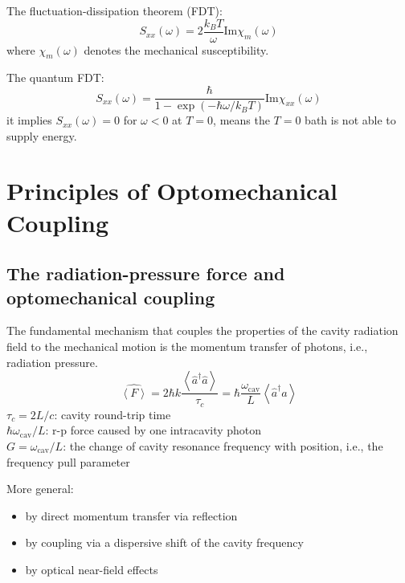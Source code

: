 \documentclass[8pt,a4paper,twocolumn]{article} %
\numberwithin{equation}{section} %
\begin{document}
				The fluctuation-dissipation theorem (FDT):
				\begin{equation}
					S_{xx}(\omega)=2 \frac{k_B T}{\omega} \text{Im} \chi_m (\omega)
				\end{equation}
				where $\chi_m (\omega)$ denotes the mechanical susceptibility.

				The quantum FDT:
				\begin{equation}
					S_{xx}(\omega)= \frac{\hbar}{1-\exp (-\hbar \omega/k_B T) } \text{Im} \chi_{xx} (\omega)
				\end{equation}
				it implies $S_{xx}(\omega)=0 $ for $ \omega<0 $ at $T=0 $, means the $ T=0 $ bath is not able to supply energy.




	\section{Principles of Optomechanical Coupling} %
	\label{sec:principles_of_optomechanical_coupling}
		\subsection{The radiation-pressure force and optomechanical coupling} %
		\label{sub:the_radiation_pressure_force}
			The fundamental mechanism that couples the properties of the cavity radiation field to the mechanical motion is the momentum transfer of photons, i.e., radiation pressure.
			\begin{equation}
				\hat{\left<  F \right>}=2\hbar k \frac{\left< \hat a^{\dagger}\hat a \right>}{\tau_c}=\hbar \frac{\omega_{\text{cav}}}{L}\left< \hat a^{\dagger}\hat a \right>
			\end{equation}
			$ \tau_c =2L/c$: cavity round-trip time\\
			$ \hbar \omega_{\text{cav}}/L $: r-p force caused by one intracavity photon\\
			$G = \omega_{\text{cav}}/L $: the change of cavity resonance frequency with position, i.e., the frequency pull parameter

			More general:
			\begin{itemize}
				\item by direct momentum transfer via reflection
				\item by coupling via a dispersive shift of the cavity frequency
				\item by optical near-field effects
			\end{itemize}
\end{document}

